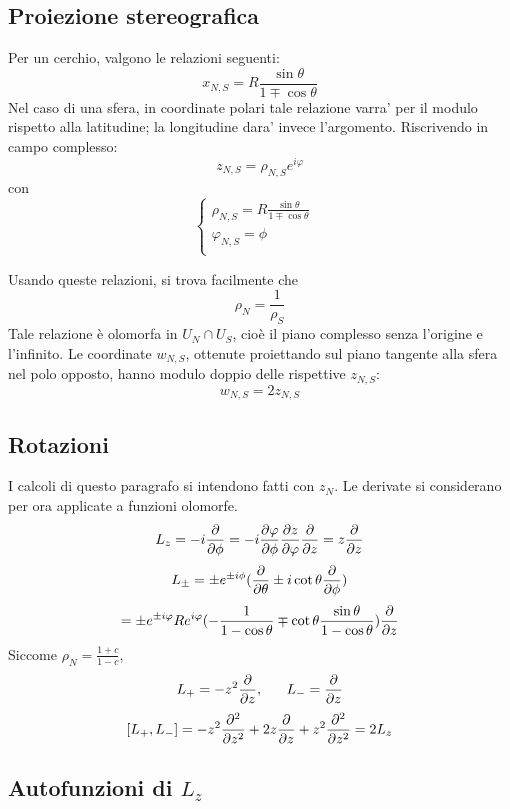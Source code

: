 \subsection{Proiezione stereografica}
Per un cerchio, valgono le relazioni seguenti:
\[ x_{N,S} = R \frac{\sin\theta}{1\mp\cos\theta} \]
Nel caso di una sfera, in coordinate polari tale relazione varra' per il modulo rispetto alla latitudine; la longitudine dara' invece l'argomento. Riscrivendo in campo complesso:
\[ z_{N,S} = \rho_{N,S} e^{i\varphi} \]
con 
\[ \begin{cases}
	\rho_{N,S} = R \frac{\sin\theta}{1\mp\cos\theta} & \\
	\varphi_{N,S} = \phi & \\
   \end{cases}
\]


Usando queste relazioni, si trova facilmente che 
\[ \rho_N = \frac{1}{\rho_S} \]
Tale relazione \`e olomorfa in \( U_N \cap U_S \), cio\`e il piano complesso senza l'origine e l'infinito.
Le coordinate $w_{N,S}$, ottenute proiettando sul piano tangente alla sfera nel polo opposto, hanno modulo doppio delle rispettive $z_{N,S}$:
\[ w_{N,S} = 2z_{N,S} \]

\subsection{Rotazioni}
I calcoli di questo paragrafo si intendono fatti con $z_N$. Le derivate si considerano per ora applicate a funzioni olomorfe.
\[ L_z = -i\frac{\partial }{\partial \phi} = -i \frac{\partial \varphi}{\partial \phi}\frac{\partial z}{\partial \varphi}\frac{\partial }{\partial z} = z\frac{\partial }{\partial z} \]
\[ L_\pm = \pm e^{\pm i\phi} (\frac{\partial }{\partial \theta} \pm i \cot\theta \frac{\partial }{\partial \phi} ) \]
\[ = \pm e^{\pm i\varphi}Re^{i\varphi}  (-\frac{1}{1- \cos\theta} \mp  \cot\theta \frac{\sin\theta}{1-\cos\theta})\frac{\partial }{\partial z}  \]
Siccome \( \rho_N = \frac{1+c}{1-c}\),
\[ L_+ = -z^2\frac{\partial }{\partial z} , \;\;\;\;\;\;  L_- = \frac{\partial }{\partial z} \]
\[ [L_+,L_-] = -z^2\frac{\partial ^2}{\partial z^2} + 2z\frac{\partial }{\partial z} + z^2\frac{\partial ^2}{\partial z^2} = 2L_z \]

\subsection{Autofunzioni di $L_z$}
